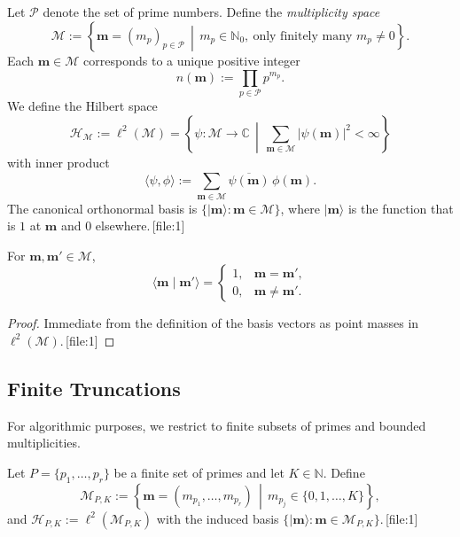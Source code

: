 \documentclass[11pt]{article}
\begin{document}
Let \(\mathcal{P}\) denote the set of prime numbers. Define the \emph{multiplicity space}
\[
\mathcal{M} := \left\{ \mathbf{m} = (m_p)_{p \in \mathcal{P}} \,\middle|\, m_p \in \mathbb{N}_0,\ \text{only finitely many } m_p \neq 0 \right\}.
\]
Each \(\mathbf{m} \in \mathcal{M}\) corresponds to a unique positive integer
\begin{equation}
    n(\mathbf{m}) := \prod_{p \in \mathcal{P}} p^{m_p}.
\end{equation}
We define the Hilbert space
\begin{equation}
    \mathcal{H}_{\mathcal{M}} := \ell^2(\mathcal{M}) = \left\{ \psi: \mathcal{M} \to \mathbb{C} \,\middle|\, \sum_{\mathbf{m} \in \mathcal{M}} |\psi(\mathbf{m})|^2 < \infty \right\}
\end{equation}
with inner product
\begin{equation}
    \langle \psi, \phi \rangle := \sum_{\mathbf{m} \in \mathcal{M}} \overline{\psi(\mathbf{m})}\,\phi(\mathbf{m}).
\end{equation}
The canonical orthonormal basis is \(\{ \lvert \mathbf{m} \rangle : \mathbf{m} \in \mathcal{M} \}\), where \(\lvert \mathbf{m} \rangle\) is the function that is \(1\) at \(\mathbf{m}\) and \(0\) elsewhere.\,[file:1]

\begin{lemma}[Orthonormality]
For \(\mathbf{m}, \mathbf{m}' \in \mathcal{M}\),
\[
\langle \mathbf{m} \mid \mathbf{m}' \rangle =
\begin{cases}
1, & \mathbf{m} = \mathbf{m}',\\[2pt]
0, & \mathbf{m} \neq \mathbf{m}'.
\end{cases}
\]
\end{lemma}

\begin{proof}
Immediate from the definition of the basis vectors as point masses in \(\ell^2(\mathcal{M})\).\,[file:1]
\end{proof}

\subsection{Finite Truncations}

For algorithmic purposes, we restrict to finite subsets of primes and bounded multiplicities.

\begin{definition}
Let \(P = \{p_1, \dots, p_r\}\) be a finite set of primes and let \(K \in \mathbb{N}\). Define
\[
\mathcal{M}_{P,K} := \left\{ \mathbf{m} = (m_{p_1},\dots,m_{p_r}) \,\middle|\, m_{p_j} \in \{0,1,\dots,K\} \right\},
\]
and \(\mathcal{H}_{P,K} := \ell^2(\mathcal{M}_{P,K})\) with the induced basis \(\{\lvert \mathbf{m} \rangle : \mathbf{m} \in \mathcal{M}_{P,K}\}\).\,[file:1]
\end{definition}
\end{document}
